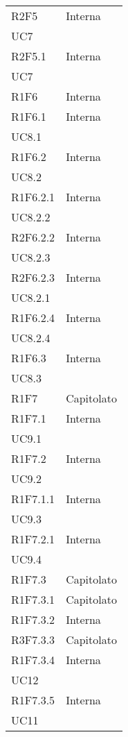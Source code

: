 \begin{longtable}{|C{6.5cm}|C{6.5cm}|}
	R2F5 &  \centering Interna \\ UC7 \tabularnewline

	R2F5.1 &  \centering Interna \\ UC7 \tabularnewline

	R1F6 & Interna \\

	R1F6.1 & \centering Interna \\ UC8.1 \tabularnewline

	R1F6.2 & \centering Interna \\ UC8.2 \tabularnewline

	R1F6.2.1 & \centering Interna \\ UC8.2.2 \tabularnewline

	R2F6.2.2 & \centering Interna \\ UC8.2.3 \tabularnewline

	R2F6.2.3 & \centering Interna \\ UC8.2.1 \tabularnewline

	R1F6.2.4 & \centering Interna \\ UC8.2.4 \tabularnewline

	R1F6.3 & \centering Interna \\ UC8.3 \tabularnewline

	R1F7 & Capitolato \\

	R1F7.1 & \centering Interna \\ UC9.1 \tabularnewline

	R1F7.2 &  \centering Interna \\ UC9.2 \tabularnewline

	R1F7.1.1 & \centering Interna \\ UC9.3 \tabularnewline

	R1F7.2.1 &   \centering Interna \\ UC9.4 \tabularnewline

	R1F7.3 &   Capitolato \\

	R1F7.3.1 &  Capitolato \\

	R1F7.3.2 &  Interna \\

	R3F7.3.3 &  Capitolato \\

	R1F7.3.4 &  \centering Interna \\ UC12 \tabularnewline

	R1F7.3.5 & \centering Interna \\ UC11 \tabularnewline


\end{longtable}
